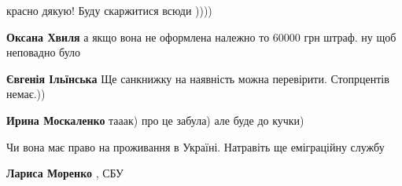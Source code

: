\begin{itemize}
\begin{itemize}
красно дякую! Буду скаржитися всюди ))))

 
\textbf{Оксана Хвиля} а якщо вона не оформлена належно то 60000 грн штраф. ну щоб неповадно було

 
\textbf{Євгенія Ільїнська} Ще санкнижку на наявність можна перевірити. Стопрцентів немає.))

 
\textbf{Ирина Москаленко} тааак) про це забула) але буде до кучки)

\end{itemize}

 
Чи вона має право на проживання в Україні. Натравіть ще еміграційну службу

\begin{itemize}
 
\textbf{Лариса Моренко} , СБУ

 

\end{itemize}
\end{itemize}
